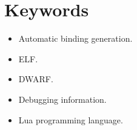\documentclass[a4paper,
	fontsize=12pt,
	titlepage=firstiscover,
	chapterprefix=true,
	appendixprefix=true,
	headings=big,
	headsepline,
	toc=bibliographynumbered,
	twoside]{scrbook}
\begin{document}
\cleardoublepage


\cleardoublepage
\chapter*{Keywords}
\begin{itemize}
	\item Automatic binding generation.
	\item \gls{ELF}.
	\item \gls{DWARF}.
	\item Debugging information.
	\item Lua programming language.
\end{itemize}

\cleardoublepage
\tableofcontents
\listoffigures
\listoftables

\mainmatter
\pagestyle{scrheadings}






\backmatter
\cleardoublepage
\printglossaries


\end{document}
